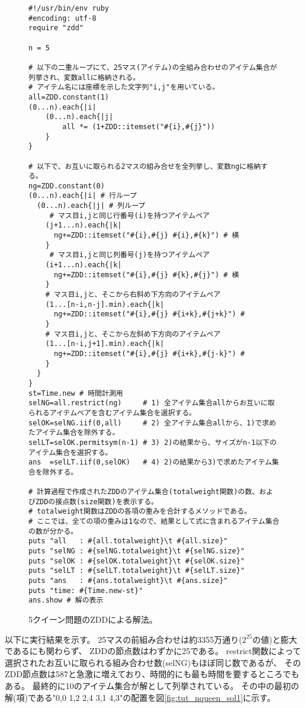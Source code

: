 \begin{figure}[!hbt]
{\small
\begin{Verbatim}[baselinestretch=0.7,frame=single]
#!/usr/bin/env ruby
#encoding: utf-8
require "zdd"

n = 5

# 以下の二重ループにて、25マス(アイテム)の全組み合わせのアイテム集合が列挙され、変数allに格納される。
# アイテム名には座標を示した文字列"i,j"を用いている。
all=ZDD.constant(1)
(0...n).each{|i|
	(0...n).each{|j|
		all *= (1+ZDD::itemset("#{i},#{j}"))
	}
}

# 以下で、お互いに取られる2マスの組み合せを全列挙し、変数ngに格納する。
ng=ZDD.constant(0)
(0...n).each{|i| # 行ループ
  (0...n).each{|j| # 列ループ
     # マス目i,jと同じ行番号(i)を持つアイテムペア
    (j+1...n).each{|k|
      ng+=ZDD::itemset("#{i},#{j} #{i},#{k}") # 横
    }
     # マス目i,jと同じ列番号(j)を持つアイテムペア
    (i+1...n).each{|k|
      ng+=ZDD::itemset("#{i},#{j} #{k},#{j}") # 横
    }
    # マス目i,jと、そこから右斜め下方向のアイテムペア
    (1...[n-i,n-j].min).each{|k|
      ng+=ZDD::itemset("#{i},#{j} #{i+k},#{j+k}") #
    }
    # マス目i,jと、そこから左斜め下方向のアイテムペア
    (1...[n-i,j+1].min).each{|k|
      ng+=ZDD::itemset("#{i},#{j} #{i+k},#{j-k}") #
    }
  }
}
st=Time.new # 時間計測用
selNG=all.restrict(ng)     # 1) 全アイテム集合allからお互いに取られるアイテムペアを含むアイテム集合を選択する。
selOK=selNG.iif(0,all)     # 2) 全アイテム集合allから、1)で求めたアイテム集合を除外する。
selLT=selOK.permitsym(n-1) # 3) 2)の結果から、サイズがn-1以下のアイテム集合を選択する。
ans  =selLT.iif(0,selOK)   # 4) 2)の結果から3)で求めたアイテム集合を除外する。

# 計算過程で作成されたZDDのアイテム集合(totalweight関数)の数、およびZDDの接点数(size関数)を表示する。
# totalweight関数はZDDの各項の重みを合計するメソッドである。
# ここでは、全ての項の重みは1なので、結果として式に含まれるアイテム集合の数が分かる。
puts "all   : #{all.totalweight}\t #{all.size}"
puts "selNG : #{selNG.totalweight}\t #{selNG.size}"
puts "selOK : #{selOK.totalweight}\t #{selOK.size}"
puts "selLT : #{selLT.totalweight}\t #{selLT.size}"
puts "ans   : #{ans.totalweight}\t #{ans.size}"
puts "time: #{Time.new-st}"
ans.show # 解の表示
\end{Verbatim}
}
\caption{5クイーン問題のZDDによる解法。\label{fig:tut_nqueen_scp1}}
\end{figure}

以下に実行結果を示す。
25マスの前組み合わせは約3355万通り($2^25$の値)と膨大であるにも関わらず、
ZDDの節点数はわずかに25である。
restrict関数によって選択されたお互いに取られる組み合わせ数(selNG)もほぼ同じ数であるが、
そのZDD節点数は587と急激に増えており、時間的にも最も時間を要するところでもある。
最終的に10のアイテム集合が解として列挙されている。
その中の最初の解(項)である"0,0 1,2 2,4 3,1 4,3"の配置を図\ref{fig:tut_nqueen_sol1}に示す。

